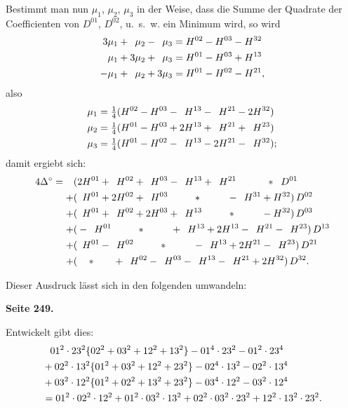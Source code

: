 \documentclass[12pt,a4paper]{article}
\theoremstyle{plain}
\theoremstyle{definition}
\theoremstyle{remark}
\begin{document}
Bestimmt man nun $\mu_1$, $\mu_2$, $\mu_3$ in der Weise, dass die Summe der Quadrate der Coefficienten von $D^{01}$, $D^{02}$, u.~s.~w. ein Minimum wird, so wird
\begin{align*}
3\mu_1 + \hphantom{3}\mu_2 - \hphantom{3}\mu_3 &= H^{02} - H^{03} - H^{32} \\
\mu_1 + 3\mu_2 + \hphantom{3}\mu_3 &= H^{01} - H^{03} + H^{13} \\
-\mu_1 + \hphantom{3}\mu_2 + 3\mu_3 &= H^{01} - H^{02} - H^{21},
\end{align*}
also
\begin{align*}
\mu_1 &= \tfrac{1}{4}(H^{02} - H^{03} - \hphantom{2}H^{13} - \hphantom{2}H^{21} - 2H^{32}) \\
\mu_2 &= \tfrac{1}{4}(H^{01} - H^{03} + 2H^{13} + \hphantom{2}H^{21} + \hphantom{2}H^{23}) \\
\mu_3 &= \tfrac{1}{4}(H^{01} - H^{02} - \hphantom{2}H^{13} - 2H^{21} - \hphantom{2}H^{32});
\end{align*}
damit ergiebt sich:
\begin{align*}
4\Delta^{\circ} = \phantom{+}(&2H^{01} + \hphantom{2}H^{02} + \hphantom{2}H^{03} - \hphantom{2}H^{13} + \hphantom{2}H^{21} \phantom{+ 2H^{22}} *\phantom{)}\, D^{01} \\
+ (&\hphantom{2}H^{01} + 2H^{02} + \hphantom{2}H^{03} \phantom{+ H^{13}} *\phantom{+ H^{21}} - \hphantom{2}H^{31} + H^{32})\, D^{02} \\
+ (&\hphantom{2}H^{01} + \hphantom{2}H^{02} + 2H^{03} + \hphantom{2}H^{13} \phantom{+ H^{21}} *\phantom{+ H^{31}} - H^{32})\, D^{03} \\
+ (&-\hphantom{2}H^{01} \phantom{+ H^{02}} *\phantom{+ H^{03}} + \hphantom{2}H^{13} + 2H^{13} - \hphantom{2}H^{21} - \hphantom{2}H^{23})\, D^{13} \\
+ (&\hphantom{2}H^{01} - \hphantom{2}H^{02} \phantom{+ H^{03}} *\phantom{+ H^{13}} - \hphantom{2}H^{13} + 2H^{21} - \hphantom{2}H^{23})\, D^{21} \\
+ (&\phantom{+}\, *\phantom{H^{01}} + \hphantom{2}H^{02} - \hphantom{2}H^{03} - \hphantom{2}H^{13} - \hphantom{2}H^{21} + 2H^{32})\, D^{32}.
\end{align*}

Dieser Ausdruck lässt sich in den folgenden umwandeln:

\newpage
\textbf{Seite 249.}

Entwickelt gibt dies:
\begin{align*}
&\hphantom{=} 01^2 \cdot 23^2 \{02^2 + 03^2 + 12^2 + 13^2\} - 01^4 \cdot 23^2 - 01^2 \cdot 23^4 \\
&+ 02^2 \cdot 13^2 \{01^2 + 03^2 + 12^2 + 23^2\} - 02^4 \cdot 13^2 - 02^2 \cdot 13^4 \\
&+ 03^2 \cdot 12^2 \{01^2 + 02^2 + 13^2 + 23^2\} - 03^4 \cdot 12^2 - 03^2 \cdot 12^4 \\
&= 01^2 \cdot 02^2 \cdot 12^2 + 01^2 \cdot 03^2 \cdot 13^2 + 02^2 \cdot 03^2 \cdot 23^2 + 12^2 \cdot 13^2 \cdot 23^2.
\end{align*}
\end{document}
